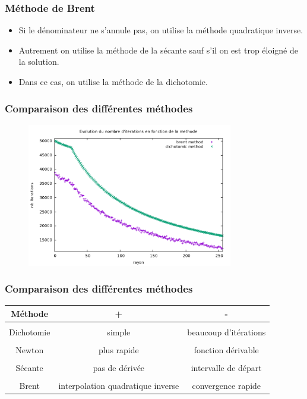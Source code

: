 \documentclass[french]{beamer}
\begin{document}

\begin{frame}
\frametitle{Méthode de Brent}

   \begin{itemize}
      \item Si le dénominateur ne s'annule pas, on utilise la méthode quadratique inverse.
      \item Autrement on utilise la méthode de la sécante sauf s'il on est trop éloigné de la solution.
      \item Dans ce cas, on utilise la méthode de la dichotomie.
   \end{itemize}
\end{frame}



\begin{frame}
\frametitle{Comparaison des différentes méthodes}

   \begin{figure}[htb!]
      \includegraphics[width=9cm]{figures/brent_method3.pdf}
   \end{figure}
\end{frame}


\begin{frame}
\frametitle{Comparaison des différentes méthodes}

   \begin{tabular}{|c|c|c|}
     \hline
        Méthode & + & - \\
     \hline
     \\
     Dichotomie & simple & beaucoup d'itérations  
     \\  
     \hline
     \\
     Newton & plus rapide  & fonction dérivable 
     \\ 
     \hline
     \\  
     Sécante & pas de dérivée & intervalle de départ 
     \\  
     \hline  
     \\  
     Brent & interpolation quadratique inverse & convergence rapide 
     \\  
     \hline
   \end{tabular}
\end{frame}
\end{document}
